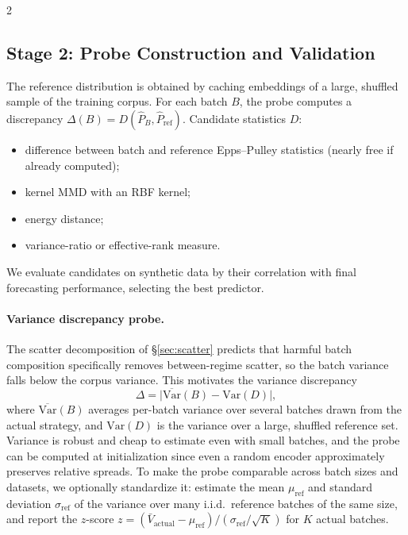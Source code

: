 \documentclass[10pt]{article}
\theoremstyle{remark}
\begin{document}
\begin{multicols*}{2}
\subsection{Stage 2: Probe Construction and Validation}

The reference distribution is obtained by caching embeddings of a large, shuffled sample of the training corpus. For each batch $B$, the probe computes a discrepancy $\Delta(B) = D(\hat{P}_B, \hat{P}_{\mathrm{ref}})$. Candidate statistics $D$:
\begin{itemize}[leftmargin=*]
    \item difference between batch and reference Epps--Pulley statistics (nearly free if already computed);
    \item kernel MMD with an RBF kernel;
    \item energy distance;
    \item variance-ratio or effective-rank measure.
\end{itemize}
We evaluate candidates on synthetic data by their correlation with final forecasting performance, selecting the best predictor.

\paragraph{Variance discrepancy probe.}
The scatter decomposition of \S\ref{sec:scatter} predicts that harmful batch composition specifically removes between-regime scatter, so the batch variance falls below the corpus variance. This motivates the variance discrepancy
\[
\Delta = \bigl| \overline{\mathrm{Var}}(B) - \mathrm{Var}(D) \bigr|,
\]
where $\overline{\mathrm{Var}}(B)$ averages per-batch variance over several batches drawn from the actual strategy, and $\mathrm{Var}(D)$ is the variance over a large, shuffled reference set. Variance is robust and cheap to estimate even with small batches, and the probe can be computed at initialization since even a random encoder approximately preserves relative spreads. To make the probe comparable across batch sizes and datasets, we optionally standardize it: estimate the mean $\mu_{\mathrm{ref}}$ and standard deviation $\sigma_{\mathrm{ref}}$ of the variance over many i.i.d.\ reference batches of the same size, and report the $z$-score $z = (\bar{V}_{\mathrm{actual}} - \mu_{\mathrm{ref}}) / (\sigma_{\mathrm{ref}} / \sqrt{K})$ for $K$ actual batches.


\end{multicols*}
\end{document}
